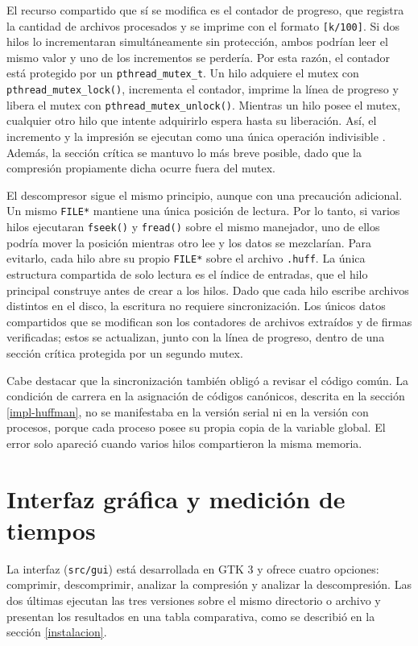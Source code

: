 \documentclass{report}
\begin{document}
El recurso compartido que sí se modifica es el contador de progreso, que registra la cantidad de archivos procesados y se imprime con el formato \texttt{[k/100]}. Si dos hilos lo incrementaran simultáneamente sin protección, ambos podrían leer el mismo valor y uno de los incrementos se perdería. Por esta razón, el contador está protegido por un \texttt{pthread\_mutex\_t}. Un hilo adquiere el mutex con \texttt{pthread\_mutex\_lock()}, incrementa el contador, imprime la línea de progreso y libera el mutex con \texttt{pthread\_mutex\_unlock()}. Mientras un hilo posee el mutex, cualquier otro hilo que intente adquirirlo espera hasta su liberación. Así, el incremento y la impresión se ejecutan como una única operación indivisible \cite{manmutex}. Además, la sección crítica se mantuvo lo más breve posible, dado que la compresión propiamente dicha ocurre fuera del mutex.

El descompresor sigue el mismo principio, aunque con una precaución adicional. Un mismo \texttt{FILE*} mantiene una única posición de lectura. Por lo tanto, si varios hilos ejecutaran \texttt{fseek()} y \texttt{fread()} sobre el mismo manejador, uno de ellos podría mover la posición mientras otro lee y los datos se mezclarían. Para evitarlo, cada hilo abre su propio \texttt{FILE*} sobre el archivo \texttt{.huff}. La única estructura compartida de solo lectura es el índice de entradas, que el hilo principal construye antes de crear a los hilos. Dado que cada hilo escribe archivos distintos en el disco, la escritura no requiere sincronización. Los únicos datos compartidos que se modifican son los contadores de archivos extraídos y de firmas verificadas; estos se actualizan, junto con la línea de progreso, dentro de una sección crítica protegida por un segundo mutex.

Cabe destacar que la sincronización también obligó a revisar el código común. La condición de carrera en la asignación de códigos canónicos, descrita en la sección \ref{impl-huffman}, no se manifestaba en la versión serial ni en la versión con procesos, porque cada proceso posee su propia copia de la variable global. El error solo apareció cuando varios hilos compartieron la misma memoria.

\section{Interfaz gráfica y medición de tiempos}\label{gui}

La interfaz (\texttt{src/gui}) está desarrollada en GTK 3 y ofrece cuatro opciones: comprimir, descomprimir, analizar la compresión y analizar la descompresión. Las dos últimas ejecutan las tres versiones sobre el mismo directorio o archivo y presentan los resultados en una tabla comparativa, como se describió en la sección \ref{instalacion}.
\end{document}
